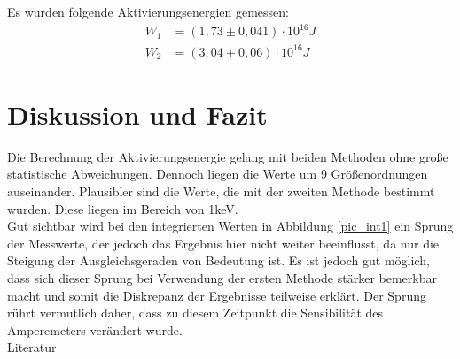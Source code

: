 Es wurden folgende Aktivierungsenergien gemessen:
\begin{align}
W_1&=(1,73    \pm 0,041)\cdot 10^{16} J\\
W_2&=(3,04	\pm 0,06)\cdot 10^{16}J
\end{align}

\section{Diskussion und Fazit}
Die Berechnung der Aktivierungsenergie gelang mit beiden Methoden ohne große statistische Abweichungen. Dennoch liegen die Werte um 9 Größenordnungen auseinander. Plausibler sind die Werte, die mit der zweiten Methode bestimmt wurden. Diese liegen im Bereich von 1keV.\\
Gut sichtbar wird bei den integrierten Werten in Abbildung \ref{pic_int1} ein Sprung der Messwerte, der jedoch das Ergebnis hier nicht weiter beeinflusst, da nur die Steigung der Ausgleichsgeraden von Bedeutung ist. Es ist jedoch gut möglich, dass sich dieser Sprung bei Verwendung der ersten Methode stärker bemerkbar macht und somit die Diskrepanz der Ergebnisse teilweise erklärt. Der Sprung rührt vermutlich daher, dass zu diesem Zeitpunkt die Sensibilität des Amperemeters verändert wurde.\\


\parskip 340pt
\Large{Literatur}\\\\





